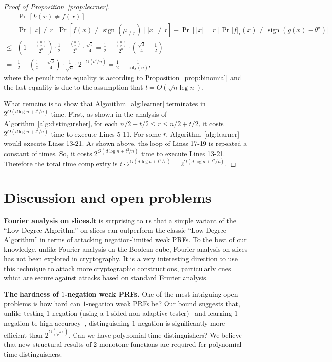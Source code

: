 \documentclass[11pt]{article}
\numberwithin{equation}{section}
\theoremstyle{definition}
\theoremstyle{plain}
\newcommand{\expref}[2]{\hyperref[#2]{#1~\ref{#2}}}
\newcommand{\warn}[1]{#1}
\begin{document}
\begin{proof}[Proof of Proposition~\ref{prop:learner}]
\begin{align}
& \Pr[h(x)\neq f(x)] \\
= &\Pr[|x|\neq r]\Pr[f(x)\neq \operatorname{sign}(\mu_{\neq r})\mid |x|\neq r]+\Pr[|x|=r]\Pr\big[f|_{r}(x)\neq \operatorname{sign}(g(x)-\theta^\star)\big]\\
\leq &\left(1-
%
\frac{\binom{n}{r}}{2^n} %
\right)\cdot \frac{1}{2}+ 
%
\frac{\binom{n}{r}}{2^n}  %
\cdot \frac{\sqrt{3}}{4} =\frac{1}{2} + 
%
\frac{\binom{n}{r}}{2^n} %
\cdot\left(\frac{\sqrt{3}}{4}-\frac{1}{2}\right)\\=&\frac{1}{2}-\left(\frac{1}{2}-\frac{\sqrt{3}}{4}\right)\cdot\frac{1}{\sqrt{n}}\cdot 2^{-O(t^2/n)}=\frac{1}{2} - \frac{1}{\mbox{poly}(n)},
%
\end{align} %
\warn{where the
%
penultimate  %
equality is according to \expref{Proposition}{prop:binomial} and the last equality is due to %
the assumption that  %
$t=O(\sqrt{n\log n})$.}

What remains is to show that \expref{Algorithm}{alg:learner} terminates in $2^{O(d\log n + t^2/n)}$ time. First, as shown in the analysis of \expref{Algorithm}{alg:distinguisher}, for each $n/2-t/2\leq r\leq n/2+t/2$, it costs $2^{O(d\log n + t^2/n)}$ time to execute Lines 5-11. For some $r$, \expref{Algorithm}{alg:learner} would execute Lines 13-21. As shown above, the loop of Lines 17-19 is  repeated a constant of times. So, it costs $2^{O(d\log n + t^2/n)}$ time to execute Lines 13-21. Therefore the total time complexity is $t\cdot 2^{O(d\log n + t^2/n)}=2^{O(d\log n + t^2/n)}$.
\end{proof}

\section{Discussion and open problems}\label{sec:discussion}

\noindent\textbf{Fourier analysis on slices.}\quad It is surprising to us that a simple variant of the ``Low-Degree Algorithm'' on slices can outperform the classic ``Low-Degree Algorithm'' in terms of attacking negation-limited weak PRFs. To the best of our knowledge, unlike Fourier analysis on the Boolean cube, Fourier analysis on slices has not been explored in cryptography. It is
%
a very  %
interesting direction to use this technique to attack more cryptographic constructions, particularly ones which are secure against attacks based on standard Fourier analysis. 

\vspace{2ex}
%
\noindent\textbf{The hardness of $1$-negation weak PRFs.} One of the most intriguing open problems is how hard can $1$-negation weak PRFs be? Our bound suggests that, unlike testing $1$ negation (using a 1-sided non-adaptive tester)~\cite{GKW19} and learning $1$ negation to high accuracy~\cite{BCOST15}, distinguishing $1$ negation is significantly more efficient than $2^{O(\sqrt{n})}$. Can we have polynomial time distinguishers? We believe that new structural results of $2$-monotone functions are required for polynomial time distinguishers.  
\end{document}
